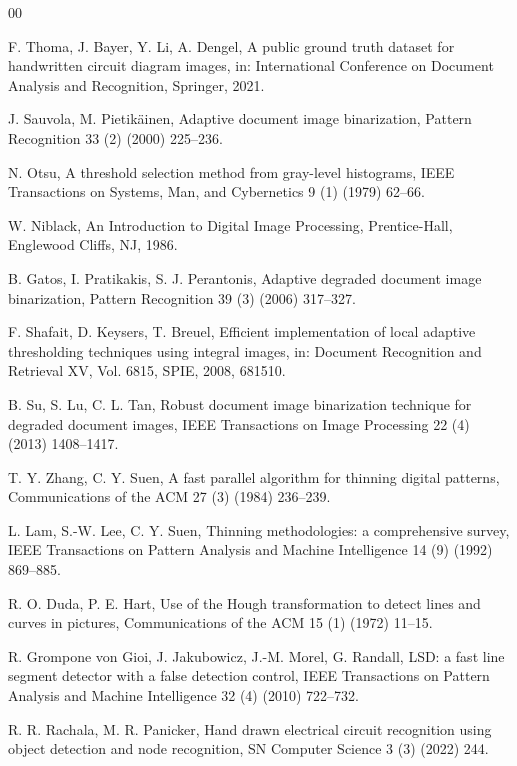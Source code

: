 \begin{thebibliography}{00}

F. Thoma, J. Bayer, Y. Li, A. Dengel, A public ground truth dataset for handwritten circuit diagram images, in: International Conference on Document Analysis and Recognition, Springer, 2021.

J. Sauvola, M. Pietik{\"a}inen, Adaptive document image binarization, Pattern Recognition 33 (2) (2000) 225--236.

N. Otsu, A threshold selection method from gray-level histograms, IEEE Transactions on Systems, Man, and Cybernetics 9 (1) (1979) 62--66.

W. Niblack, An Introduction to Digital Image Processing, Prentice-Hall, Englewood Cliffs, NJ, 1986.

B. Gatos, I. Pratikakis, S. J. Perantonis, Adaptive degraded document image binarization, Pattern Recognition 39 (3) (2006) 317--327.

F. Shafait, D. Keysers, T. Breuel, Efficient implementation of local adaptive thresholding techniques using integral images, in: Document Recognition and Retrieval XV, Vol. 6815, SPIE, 2008, 681510.

B. Su, S. Lu, C. L. Tan, Robust document image binarization technique for degraded document images, IEEE Transactions on Image Processing 22 (4) (2013) 1408--1417.

T. Y. Zhang, C. Y. Suen, A fast parallel algorithm for thinning digital patterns, Communications of the ACM 27 (3) (1984) 236--239.

L. Lam, S.-W. Lee, C. Y. Suen, Thinning methodologies: a comprehensive survey, IEEE Transactions on Pattern Analysis and Machine Intelligence 14 (9) (1992) 869--885.

R. O. Duda, P. E. Hart, Use of the Hough transformation to detect lines and curves in pictures, Communications of the ACM 15 (1) (1972) 11--15.

R. Grompone von Gioi, J. Jakubowicz, J.-M. Morel, G. Randall, LSD: a fast line segment detector with a false detection control, IEEE Transactions on Pattern Analysis and Machine Intelligence 32 (4) (2010) 722--732.

R. R. Rachala, M. R. Panicker, Hand drawn electrical circuit recognition using object detection and node recognition, SN Computer Science 3 (3) (2022) 244.


\end{thebibliography}
